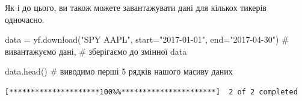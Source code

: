 \documentclass[
  letterpaper,
]{report}
\newenvironment{Shaded}{\begin{snugshade}}{\end{snugshade}}
\newcommand{\CommentTok}[1]{\textcolor[rgb]{0.37,0.37,0.37}{#1}}
\newcommand{\NormalTok}[1]{\textcolor[rgb]{0.00,0.23,0.31}{#1}}
\newcommand{\OperatorTok}[1]{\textcolor[rgb]{0.37,0.37,0.37}{#1}}
\newcommand{\StringTok}[1]{\textcolor[rgb]{0.13,0.47,0.30}{#1}}
\begin{document}
Як і до цього, ви також можете завантажувати дані для кількох тикерів
одночасно.

\begin{Shaded}
\begin{Highlighting}[]
\NormalTok{data }\OperatorTok{=}\NormalTok{ yf.download(}\StringTok{"SPY AAPL"}\NormalTok{, }
\NormalTok{                   start}\OperatorTok{=}\StringTok{"2017{-}01{-}01"}\NormalTok{, }
\NormalTok{                   end}\OperatorTok{=}\StringTok{"2017{-}04{-}30"}\NormalTok{) }\CommentTok{\# вивантажуємо дані, }
                                     \CommentTok{\# зберігаємо до змінної data}

\NormalTok{data.head() }\CommentTok{\# виводимо перші 5 рядків нашого масиву даних }
\end{Highlighting}
\end{Shaded}

\begin{verbatim}
[*********************100%%**********************]  2 of 2 completed
\end{verbatim}

\begin{verbatim}
\end{verbatim}
\end{document}
